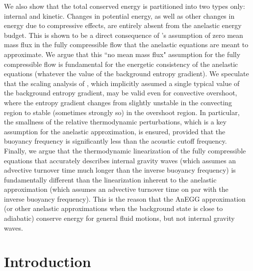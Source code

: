 \documentclass[12pt]{article}
\begin{document}
We also show that the total conserved energy is partitioned into two types only: internal and kinetic. Changes in potential energy, as well as other changes in energy due to compressive effects, are entirely absent from the anelastic energy budget. This is shown to be a direct consequence of \citet{Gough1969}'s assumption of zero mean mass flux in the fully compressible flow that the anelastic equations are meant to approximate. We argue that this ``no mean mass flux" assumption for the fully compressible flow is fundamental for the energetic consistency of the anelastic equations (whatever the value of the background entropy gradient). We speculate that the scaling analysis of \citet{Gough1969}, which implicitly assumed a single typical value of the background entropy gradient, may be valid even for convective overshoot, where the entropy gradient changes from slightly unstable in the convecting region to stable (sometimes strongly so) in the overshoot region. In particular, the smallness of the relative thermodynamic perturbations, which is a key assumption for the anelastic approximation, is ensured, provided that the buoyancy frequency is significantly less than the acoustic cutoff frequency. Finally, we argue that the thermodynamic linearization of the fully compressible equations that accurately describes internal gravity waves (which assumes an advective turnover time much longer than the inverse buoyancy frequency) is fundamentally different than the linearization inherent to the anelastic approximation (which assumes an advective turnover time on par with the inverse buoyancy frequency). This is the reason that the AnEGG approximation (or other anelastic approximations when the background state is close to adiabatic) conserve energy for general fluid motions, but not internal gravity waves. 
	\\
	
	\section{Introduction}\label{sec:intro}
	
\end{document}
